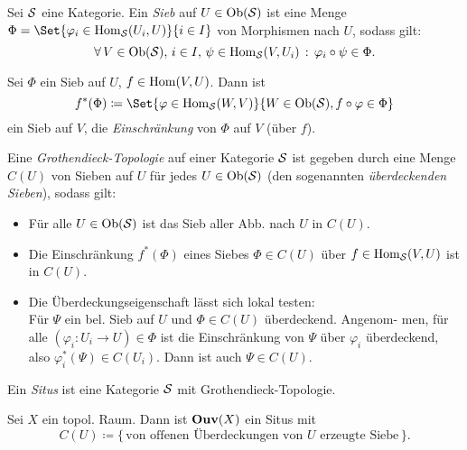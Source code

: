 \documentclass{cheat-sheet}
\begin{document}
\begin{defn}
  Sei $\mathcal{S}$ eine Kategorie. Ein \emph{Sieb} auf $U \in \operatorname{Ob}(\mathcal{S})$ ist eine Menge $\Phi = \Set{\varphi_i \in \Hom_\Sit(U_i, U)}{i \in I}$ von Morphismen nach $U$, sodass gilt:
  \[ \forall \, {V \in \operatorname{Ob}(\mathcal{S}), \, i \in I, \, \psi \in \operatorname{Hom}_{\mathcal{S}}(V, U_i)} \,:\, \varphi_i \circ \psi \in \Phi. \]
\end{defn}

\begin{bem}
  Sei $\Phi$ ein Sieb auf $U$, $f \in \operatorname{Hom}(V, U)$. Dann ist
  \[ f^*(\Phi) \coloneqq \Set{\varphi \in \Hom_\Sit(W, V)}{W \in \Ob(\Sit), f \circ \varphi \in \Phi} \]
  ein Sieb auf $V$, die \emph{Einschränkung} von $\Phi$ auf $V$ (über $f$).
\end{bem}

\begin{defn}
  Eine \emph{Grothendieck-Topologie} auf einer Kategorie $\mathcal{S}$ ist gegeben durch eine Menge $C(U)$ von Sieben auf $U$ für jedes $U \in \operatorname{Ob}(\mathcal{S})$ (den sogenannten \emph{überdeckenden Sieben}), sodass gilt:
  \begin{itemize}
    \item Für alle $U \in \operatorname{Ob}(\mathcal{S})$ ist das Sieb aller Abb. nach $U$ in $C(U)$.
    \item Die Einschränkung $f^*(\Phi)$ eines Siebes $\Phi \in C(U)$ über $f \in \operatorname{Hom}_{\mathcal{S}}(V, U)$ ist in $C(U)$.
    \item Die Überdeckungseigenschaft lässt sich lokal testen: \\
    Für $\Psi$ ein bel. Sieb auf $U$ und $\Phi \in C(U)$ überdeckend. Angenom- men, für alle $(\varphi_i : U_i \to U) \in \Phi$ ist die Einschränkung von $\Psi$ über $\varphi_i$ überdeckend, also $\varphi_i^*(\Psi) \in C(U_i)$. Dann ist auch $\Psi \in C(U)$.
  \end{itemize}
\end{defn}


\begin{defn}
  Ein \emph{Situs} ist eine Kategorie $\mathcal{S}$ mit Grothendieck-Topologie.
\end{defn}

\begin{defn}
  Sei $X$ ein topol. Raum. Dann ist $\mathbf{Ouv}(X)$ ein Situs mit
  \[ C(U) \coloneqq \{ \, \text{von offenen Überdeckungen von $U$ erzeugte Siebe} \, \}. \]
\end{defn}
\end{document}
